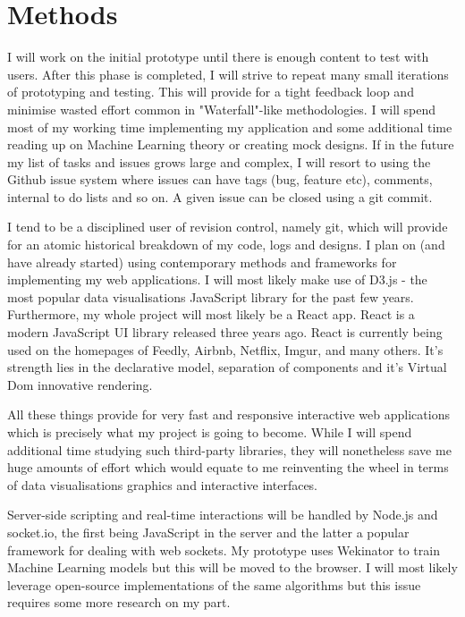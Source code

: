 \documentclass[a4paper, 11pt]{article}
\begin{document}
  \section{Methods}
  I will work on the initial prototype until there is enough content to test with users. After this phase is completed, I will strive to repeat many small iterations of prototyping and testing. This will provide for a tight feedback loop and minimise wasted effort common in "Waterfall"-like methodologies. I will spend most of my working time implementing my application and some additional time reading up on Machine Learning theory or creating mock designs. If in the future my list of tasks and issues grows large and complex, I will resort to using the Github issue system where issues can have tags (bug, feature etc), comments, internal to do lists and so on. A given issue can be closed using a git commit.

  I tend to be a disciplined user of revision control, namely git, which will provide for an atomic historical breakdown of my code, logs and designs. I plan on (and have already started) using contemporary methods and frameworks for implementing my web applications. I will most likely make use of D3.js - the most popular data visualisations JavaScript library for the past few years. Furthermore, my whole project will most likely be a React app. React is a modern JavaScript UI library released three years ago. React is currently being used on the homepages of Feedly, Airbnb, Netflix, Imgur, and many others. It's strength lies in the declarative model, separation of components and it's Virtual Dom innovative rendering.

  All these things provide for very fast and responsive interactive web applications which is precisely what my project is going to become. While I will spend additional time studying such third-party libraries, they will nonetheless save me huge amounts of effort which would equate to me reinventing the wheel in terms of data visualisations graphics and interactive interfaces.

  Server-side scripting and real-time interactions will be handled by Node.js and socket.io, the first being JavaScript in the server and the latter a popular framework for dealing with web sockets. My prototype uses Wekinator to train Machine Learning models but this will be moved to the browser. I will most likely leverage open-source implementations of the same algorithms but this issue requires some more research on my part.
\end{document}
